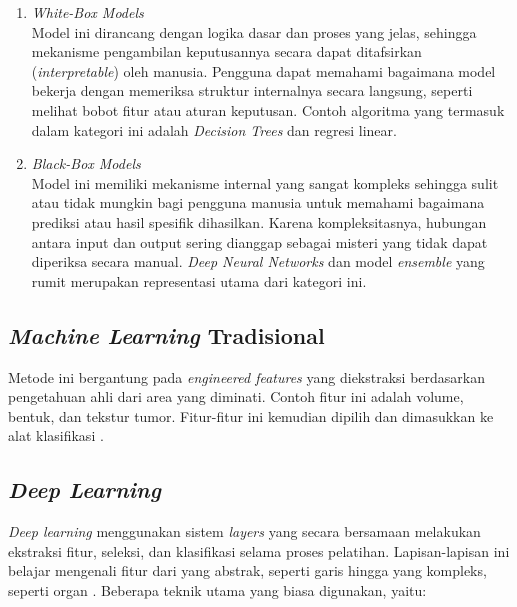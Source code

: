 \begin{enumerate}
	\item \textit{White-Box Models} \\
	Model ini dirancang dengan logika dasar dan proses yang jelas, sehingga mekanisme pengambilan keputusannya secara dapat ditafsirkan (\textit{interpretable}) oleh manusia. Pengguna dapat memahami bagaimana model bekerja dengan memeriksa struktur internalnya secara langsung, seperti melihat bobot fitur atau aturan keputusan. Contoh algoritma yang termasuk dalam kategori ini adalah \textit{Decision Trees} dan regresi linear.
	
	\item \textit{Black-Box Models} \\
	Model ini memiliki mekanisme internal yang sangat kompleks sehingga sulit atau tidak mungkin bagi pengguna manusia untuk memahami bagaimana prediksi atau hasil spesifik dihasilkan. Karena kompleksitasnya, hubungan antara input dan output sering dianggap sebagai misteri yang tidak dapat diperiksa secara manual. \textit{Deep Neural Networks} dan model \textit{ensemble} yang rumit merupakan representasi utama dari kategori ini.
\end{enumerate}

\subsection{\textit{Machine Learning} Tradisional}
Metode ini bergantung pada \textit{engineered features} yang diekstraksi berdasarkan pengetahuan ahli dari area yang diminati. Contoh fitur ini adalah volume, bentuk, dan tekstur tumor. Fitur-fitur ini kemudian dipilih dan dimasukkan ke alat klasifikasi \autocite{hosny2018artificial}. 

\subsection{\textit{Deep Learning}}
\textit{Deep learning} menggunakan sistem \textit{layers} yang secara bersamaan melakukan ekstraksi fitur, seleksi, dan klasifikasi selama proses pelatihan. Lapisan-lapisan ini belajar mengenali fitur dari yang abstrak, seperti garis hingga yang kompleks, seperti organ \autocite{hosny2018artificial}. Beberapa teknik utama yang biasa digunakan, yaitu:

